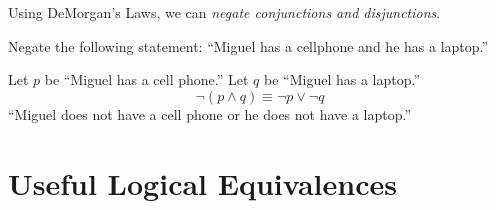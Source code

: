 Using DeMorgan's Laws, we can \emph{negate conjunctions and disjunctions}.

\begin{ex}
  Negate the following statement:
  ``Miguel has a cellphone and he has a laptop.''
  \begin{sol}
    Let \(p\) be ``Miguel has a cell phone.''
    Let \(q\) be ``Miguel has a laptop.''
    \[ \neg(p \land q) \equiv \neg p \lor \neg q \]
    ``Miguel does not have a cell phone or he does not have a laptop.''
  \end{sol}
\end{ex}

\section{Useful Logical Equivalences}

